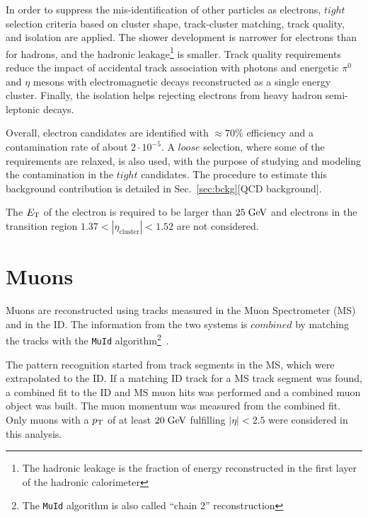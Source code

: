 In order to suppress the mis-identification of other particles  
as electrons, $tight$ selection criteria based on cluster shape, 
track-cluster matching, track quality, and isolation are applied.
The shower development is narrower for electrons than for hadrons, and
the hadronic leakage\footnote{The hadronic leakage is the fraction of 
energy reconstructed in the first layer of the hadronic calorimeter}
is smaller. Track quality requirements reduce the impact of accidental 
track association with photons and energetic $\pi^0$ and $\eta$ mesons
with electromagnetic decays reconstructed as a single energy cluster.
Finally, the isolation helps rejecting electrons from heavy hadron 
semi-leptonic decays.

Overall, electron candidates are identified with \mbox{$\approx{}70\%$} 
efficiency and a contamination rate of about \mbox{$2\cdot{}10^{-5}$}.
A $loose$ selection, where some of the requirements are relaxed, 
is also used, with the purpose of studying and modeling the contamination
in the $tight$ candidates. The procedure to estimate this background
contribution is detailed in Sec.~\ref{sec:bckg}[QCD background].

The $\mbox{\ensuremath{E_{\mathrm{T}}}}$ of the electron is required to be larger than \mbox{$25 \; \mathrm{GeV}$}
and electrons in the transition region $1.37<|\eta_{\mathrm{cluster}}|<1.52$
are not considered.

\section{Muons}
\label{sec:muons}

Muons are reconstructed using tracks measured in the 
Muon Spectrometer (MS) and in the ID.
The information from the two systems is $combined$ by matching
the tracks with the \texttt{MuId} algorithm\footnote{The \texttt{MuId} 
algorithm is also called ``chain 2'' reconstruction}~\cite{muid}.












The pattern recognition started from track segments in the MS, which were extrapolated to the ID.
If a matching ID track for a MS track segment was found, a combined fit to the ID and MS muon hits was performed and a combined muon
object was built.
The muon momentum was measured from the combined fit.
Only muons with a $p_{\mathrm{T}}$ of at least \mbox{$20 \; \mathrm{GeV}$} fulfilling \mbox{$|\eta| < 2.5$} were considered in this analysis.

